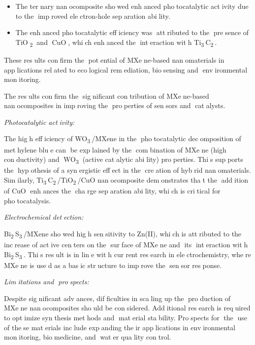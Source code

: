 {\begin{itemize}
\item
  The ternary nanocomposite showed enhanced photocatalytic
  activity due to the improved electron-hole separation ability.
\item
  The enhanced photocatalytic efficiency was attributed to the
  presence of TiO\textsubscript{2} and CuO, which enhanced the
  interaction with Ti\textsubscript{3}C\textsubscript{2}.
\end{itemize}

These results confirm the potential of MXene-based nanomaterials
in applications related to ecological remediation, biosensing and
environmental monitoring.

The results confirm the significant contribution of MXene-based
nanocomposites in improving the properties of sensors and
catalysts.

\emph{Photocatalytic activity:}

The high efficiency of WO\textsubscript{3}/MXene in the
photocatalytic decomposition of methylene blue can be explained by
the combination of MXene (high conductivity) and
WO\textsubscript{3} (active catalytic ability) properties. This
supports the hypothesis of a synergistic effect in the creation
of hybrid nanomaterials. Similarly,
Ti\textsubscript{3}C\textsubscript{2}/TiO\textsubscript{2}/CuO
nanocomposite demonstrates that the addition of CuO enhances the
charge separation ability, which is critical for photocatalysis.

\emph{Electrochemical detection:}

Bi\textsubscript{2}S\textsubscript{3}/MXene showed high sensitivity
to Zn(II), which is attributed to the increase of active centers
on the surface of MXene and its interaction with
Bi\textsubscript{2}S\textsubscript{3}. This result is in line with
current research in electrochemistry, where MXene is used as a
basic structure to improve the sensor response.

\emph{Lim}\emph{itations and prospects:}

Despite significant advances, difficulties in scaling up the
production of MXene nanocomposites should be considered.
Additional research is required to optimize synthesis methods and
material stability. Prospects for the use of these materials
include expanding their applications in environmental monitoring,
biomedicine, and water quality control.

}
